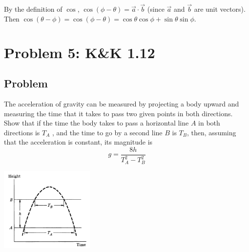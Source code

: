 \documentclass[solutions]{esg8012pset}
\begin{document}
  By the definition of $\cos$, $\cos(\phi - \theta) = \vec a \cdot \vec b$ (since $\vec a$ and $\vec b$ are unit vectors).  Then $\cos(\theta - \phi) = \cos(\phi - \theta) = \cos\theta\cos\phi + \sin\theta\sin\phi$.
\section*{Problem 5: K\&K 1.12}
\subsection*{Problem}
  The acceleration of gravity can be measured by projecting a body upward and measuring the
  time that it takes to pass two given points in both directions. Show that if the time the body takes
  to pass a horizontal line $A$ in both directions is $T_A$ , and the time to go by a second line $B$ is $T_B$,
  then, assuming that the acceleration is constant, its magnitude is
  $$g = \frac{8h}{T_A^2 - T_B^2}$$
  \begin{center}\includegraphics[width=0.35\textwidth]{ps01_1}\end{center}
\end{document}
